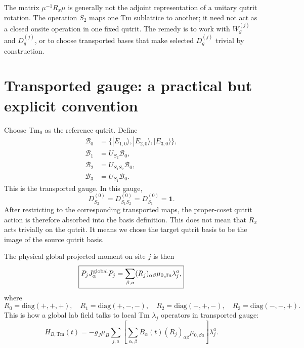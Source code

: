 \documentclass[11pt,a4paper]{article}
\newcommand{\Tm}{\mathrm{Tm}}
\newcommand{\diag}{\mathrm{diag}}
\newcommand{\ket}[1]{|#1\rangle}
\begin{document}
\begin{warnbox}
The matrix $\mu^{-1}R_x\mu$ is generally not the adjoint representation of a unitary qutrit rotation.  The operation $S_2$ maps one Tm sublattice to another; it need not act as a closed onsite operation in one fixed qutrit.  The remedy is to work with $W_g^{(j)}$ and $D_g^{(j)}$, or to choose transported bases that make selected $D_g^{(j)}$ trivial by construction.
\end{warnbox}

\section{Transported gauge: a practical but explicit convention}

Choose Tm$_0$ as the reference qutrit.  Define
\begin{align}
  \mathcal B_0&=\{\ket{E_{1,0}},\ket{E_{2,0}},\ket{E_{3,0}}\},\\
  \mathcal B_1&=U_{S_2}\mathcal B_0,\\
  \mathcal B_2&=U_{S_1S_2}\mathcal B_0,\\
  \mathcal B_3&=U_{S_1}\mathcal B_0.
\end{align}
This is the transported gauge.  In this gauge,
\begin{equation}
  D_{S_2}^{(0)}=D_{S_1S_2}^{(0)}=D_{S_1}^{(0)}=\mathbf 1 .
\end{equation}
After restricting to the corresponding transported maps, the proper-coset qutrit action is therefore absorbed into the basis definition.
This does not mean that $R_x$ acts trivially on the qutrit.  It means we chose the target qutrit basis to be the image of the source qutrit basis.

The physical global projected moment on site $j$ is then
\begin{equation}
  \boxed{
  P_jJ_\alpha^{\rm global}P_j
  =\sum_{\beta,a}(R_j)_{\alpha\beta}\mu_{0,\beta a}\lambda_j^a,}
  \label{eq:global-PJP-transported}
\end{equation}
where
\begin{equation}
  R_0=\diag(+,+,+),\quad
  R_1=\diag(+,-,-),\quad
  R_2=\diag(-,+,-),\quad
  R_3=\diag(-,-,+).
\end{equation}
This is how a global lab field talks to local Tm $\lambda_j$ operators in transported gauge:
\begin{equation}
  H_{B,\Tm}(t)=-g_J\mu_B\sum_{j,a}
  \left[\sum_{\alpha,\beta}B_\alpha(t)(R_j)_{\alpha\beta}\mu_{0,\beta a}\right]
  \lambda_j^a.
\end{equation}
\end{document}
